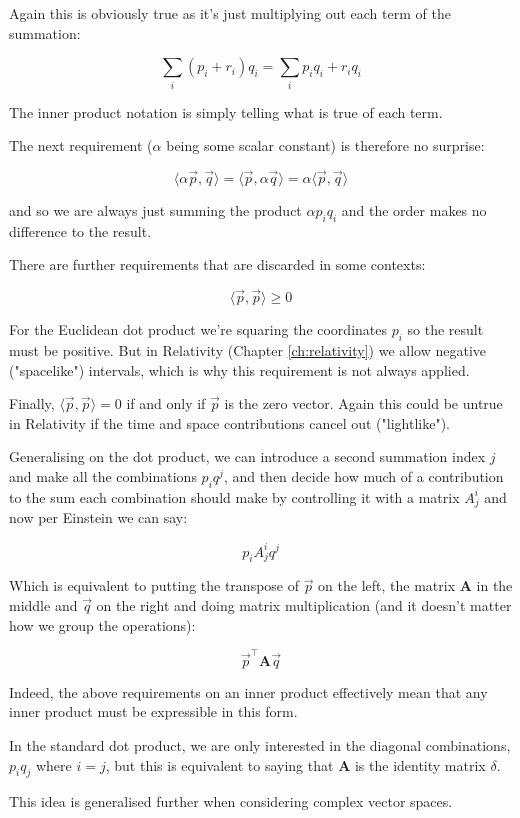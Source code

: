 Again this is obviously true as it's just multiplying out each term of the summation:

$$\sum_i (p_i + r_i)q_i = \sum_i p_iq_i + r_iq_i$$

The inner product notation is simply telling what is true of each term.

The next requirement ($\alpha$ being some scalar constant) is therefore no surprise:

$$\langle \alpha \vec{p},\vec{q}\rangle = \langle \vec{p},\alpha \vec{q}\rangle = \alpha \langle \vec{p},\vec{q}\rangle$$

and so we are always just summing the product $\alpha p_i q_i$ and the order makes no difference to the result.

There are further requirements that are discarded in some contexts:

$$\langle \vec{p},\vec{p}\rangle \geq 0$$

For the Euclidean dot product we're squaring the coordinates $p_i$ so the result must be positive. But in Relativity (Chapter \ref{ch:relativity}) we allow negative ("spacelike") intervals, which is why this requirement is not always applied.

Finally, $\langle \vec{p},\vec{p}\rangle = 0$ if and only if $\vec{p}$ is the zero vector. Again this could be untrue in Relativity if the time and space contributions cancel out ("lightlike").

Generalising on the dot product, we can introduce a second summation index $j$ and make all the combinations $p_iq^j$, and then decide how much of a contribution to the sum each combination should make by controlling it with a matrix $A^i_j$ and now per Einstein we can say:

$$p_i A^i_j q^j$$

Which is equivalent to putting the transpose of $\vec{p}$ on the left, the matrix $\mathbf{A}$ in the middle and $\vec{q}$ on the right and doing matrix multiplication (and it doesn't matter how we group the operations):

$$\vec{p}^\intercal\mathbf{A}\vec{q}$$

Indeed, the above requirements on an inner product effectively mean that any inner product must be expressible in this form.

In the standard dot product, we are only interested in the diagonal combinations, $p_i q_j$ where $i=j$, but this is equivalent to saying that $\mathbf{A}$ is the identity matrix $\delta$.

This idea is generalised further when considering complex vector spaces.


